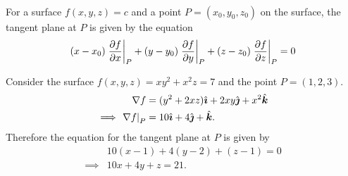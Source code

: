 \documentclass[../multivariate_calculus.tex]{subfiles}
\begin{document}
        \paragraph{}
        For a surface $f(x,y,z)=c$ and a point $P=(x_0,y_0,z_0)$ on the surface, the tangent plane at $P$ is given by the equation
        \begin{equation}
            (x-x_0)\left.\frac{\partial f}{\partial x}\right|_P+(y-y_0)\left.\frac{\partial f}{\partial y}\right|_P+(z-z_0)\left.\frac{\partial f}{\partial z}\right|_P=0
        \end{equation}
        \begin{example}
            Consider the surface $f(x,y,z)=xy^2+x^2z=7$ and the point $P=(1,2,3)$.
            \begin{align}
                \nabla f&=(y^2+2xz)\hat{\boldsymbol{\imath}}+2xy\hat{\boldsymbol{\jmath}}+x^2\hat{\boldsymbol{k}}\\
                \implies\left.\nabla f\right|_P&=10\hat{\boldsymbol{\imath}}+4\hat{\boldsymbol{\jmath}}+\hat{\boldsymbol{k}}.
            \end{align}
            Therefore the equation for the tangent plane at $P$ is given by
            \begin{align}
                &10(x-1)+4(y-2)+(z-1)=0\\
                \implies&10x+4y+z=21.
            \end{align}
        \end{example}
\end{document}
